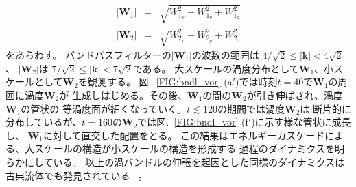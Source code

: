 \documentclass[12pt,a4paper]{jbook}
\begin{document}
            \begin{eqnarray}
                |\bm{W}_1| & = & \sqrt{W_{1_x}^2+W_{1_y}^2+W_{1_z}^2}
                \\
                |\bm{W}_2| & = & \sqrt{W_{2_x}^2+W_{2_y}^2+W_{2_z}^2}
            \end{eqnarray}
            をあらわす。
			バンドパスフィルターの$|\bm{W}_1|$の波数の範囲は
			$4/\sqrt{2} \leq |\bm{k}| < 4\sqrt{2}$、
			$|\bm{W}_2|$は
			$7/\sqrt{2} \leq |\bm{k}| < 7\sqrt{2}$である。
			大スケールの渦度分布として$\bm{W}_1$、小スケールとして$\bm{W}_2$を観測する。
			図.~\ref{FIG:bndl_vor} (a$'$)では時刻$t=40$で$\bm{W}_1$の周囲に渦度$\bm{W}_2$が
			生成しはじめる。その後、$\bm{W}_1$の間の$\bm{W}_2$が引き伸ばされ、渦度$\bm{W}_1$の管状の
			等渦度面が細くなっていく。$t \lesssim 120$の期間では渦度$\bm{W}_2$は
			断片的に分布しているが、$t=160$の$\bm{W}_2$では図.~\ref{FIG:bndl_vor} (f$'$)に示す様な管状に成長し、
			$\bm{W}_1$に対して直交した配置をとる。
			この結果はエネルギーカスケードによる、大スケールの構造が小スケールの構造を形成する
			過程のダイナミクスを明らかにしている。
			以上の渦バンドルの伸張を起因とした同様のダイナミクスは古典流体でも発見されている
			~\cite{Goto2, Melander, Kerr2}。
\end{document}
